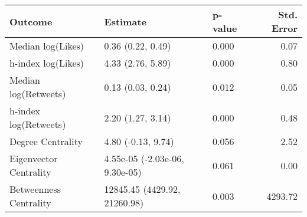 \begin{table}[ht]
\centering
\begin{tabular}{lllr}
  \hline
Outcome & Estimate & p-value & Std. Error \\ 
  \hline
Median log(Likes) & 0.36 (0.22, 0.49) & 0.000 & 0.07 \\ 
  h-index log(Likes) & 4.33 (2.76, 5.89) & 0.000 & 0.80 \\ 
  Median log(Retweets) & 0.13 (0.03, 0.24) & 0.012 & 0.05 \\ 
  h-index log(Retweets) & 2.20 (1.27, 3.14) & 0.000 & 0.48 \\ 
  Degree Centrality & 4.80 (-0.13, 9.74) & 0.056 & 2.52 \\ 
  Eigenvector Centrality & 4.55e-05 (-2.03e-06, 9.30e-05) & 0.061 & 0.00 \\ 
  Betweenness Centrality & 12845.45 (4429.92, 21260.98) & 0.003 & 4293.72 \\ 
   \hline
\end{tabular}
\end{table}
